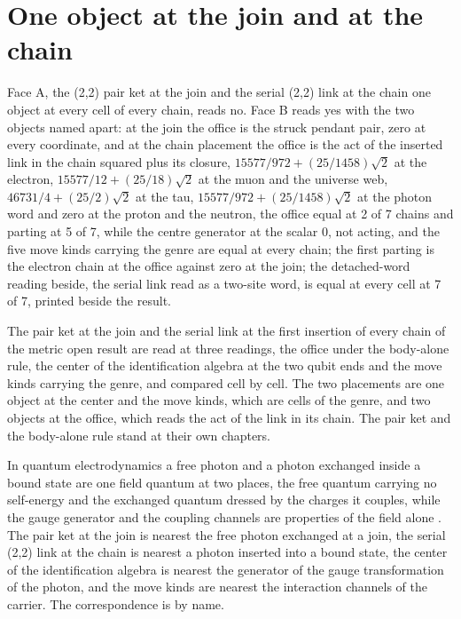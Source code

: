 \section{One object at the join and at the chain}\label{mod:X-0-D542353-w-onob}
\begin{chwall}
Face A, the (2,2) pair ket at the join and the serial (2,2) link at the chain one object at every cell of every chain, reads no. Face B reads yes with the two objects named apart: at the join the office is the struck pendant pair, zero at every coordinate, and at the chain placement the office is the act of the inserted link in the chain squared plus its closure, $15577/972 + (25/1458)\sqrt{2}$ at the electron, $15577/12 + (25/18)\sqrt{2}$ at the muon and the universe web, $46731/4 + (25/2)\sqrt{2}$ at the tau, $15577/972 + (25/1458)\sqrt{2}$ at the photon word and zero at the proton and the neutron, the office equal at 2 of 7 chains and parting at 5 of 7, while the centre generator at the scalar 0, not acting, and the five move kinds carrying the genre are equal at every chain; the first parting is the electron chain at the office against zero at the join; the detached-word reading beside, the serial link read as a two-site word, is equal at every cell at 7 of 7, printed beside the result.
\end{chwall}
\chdeps{}{}
The pair ket at the join and the serial link at the first insertion of every chain of the metric open result are read at three readings, the office under the body-alone rule, the center of the identification algebra at the two qubit ends and the move kinds carrying the genre, and compared cell by cell. The two placements are one object at the center and the move kinds, which are cells of the genre, and two objects at the office, which reads the act of the link in its chain. The pair ket and the body-alone rule stand at their own chapters.
\begin{chbridge}
In quantum electrodynamics a free photon and a photon exchanged inside a bound state are one field quantum at two places, the free quantum carrying no self-energy and the exchanged quantum dressed by the charges it couples, while the gauge generator and the coupling channels are properties of the field alone \cite{Dirac1927,Peskin1995}. The pair ket at the join is nearest the free photon exchanged at a join, the serial (2,2) link at the chain is nearest a photon inserted into a bound state, the center of the identification algebra is nearest the generator of the gauge transformation of the photon, and the move kinds are nearest the interaction channels of the carrier. The correspondence is by name.
\end{chbridge}
